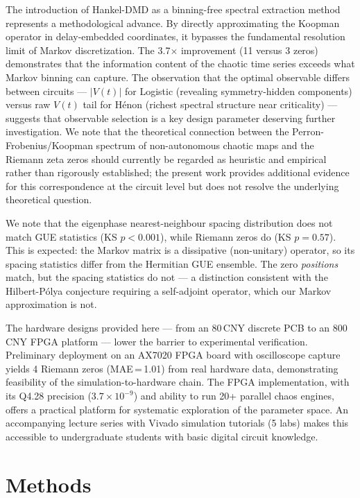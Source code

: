 \documentclass[11pt]{article}
\begin{document}
The introduction of Hankel-DMD as a binning-free spectral extraction method represents a methodological advance. By directly approximating the Koopman operator in delay-embedded coordinates, it bypasses the fundamental resolution limit of Markov discretization. The 3.7$\times$ improvement (11 versus 3 zeros) demonstrates that the information content of the chaotic time series exceeds what Markov binning can capture. The observation that the optimal observable differs between circuits --- $|V(t)|$ for Logistic (revealing symmetry-hidden components) versus raw $V(t)$ tail for H\'enon (richest spectral structure near criticality) --- suggests that observable selection is a key design parameter deserving further investigation. We note that the theoretical connection between the Perron-Frobenius/Koopman spectrum of non-autonomous chaotic maps and the Riemann zeta zeros should currently be regarded as heuristic and empirical rather than rigorously established; the present work provides additional evidence for this correspondence at the circuit level but does not resolve the underlying theoretical question.

We note that the eigenphase nearest-neighbour spacing distribution does not match GUE statistics (KS $p < 0.001$), while Riemann zeros do (KS $p = 0.57$). This is expected: the Markov matrix is a dissipative (non-unitary) operator, so its spacing statistics differ from the Hermitian GUE ensemble. The zero \emph{positions} match, but the spacing statistics do not --- a distinction consistent with the Hilbert-P\'olya conjecture requiring a self-adjoint operator, which our Markov approximation is not.

The hardware designs provided here --- from an 80\,CNY discrete PCB to an 800\,CNY FPGA platform --- lower the barrier to experimental verification. Preliminary deployment on an AX7020 FPGA board with oscilloscope capture yields 4 Riemann zeros (MAE\,=\,1.01) from real hardware data, demonstrating feasibility of the simulation-to-hardware chain. The FPGA implementation, with its Q4.28 precision ($3.7 \times 10^{-9}$) and ability to run 20+ parallel chaos engines, offers a practical platform for systematic exploration of the parameter space. An accompanying lecture series with Vivado simulation tutorials (5 labs) makes this accessible to undergraduate students with basic digital circuit knowledge.

\section*{Methods}
\end{document}
